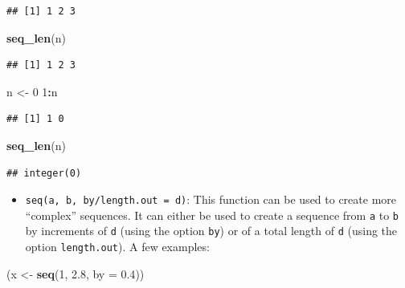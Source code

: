 \documentclass[12pt,]{krantz}
\newenvironment{Shaded}{\begin{snugshade}}{\end{snugshade}}
\newcommand{\KeywordTok}[1]{\textcolor[rgb]{0.27,0.27,0.27}{\textbf{#1}}}
\newcommand{\DataTypeTok}[1]{\textcolor[rgb]{0.27,0.27,0.27}{#1}}
\newcommand{\DecValTok}[1]{\textcolor[rgb]{0.06,0.06,0.06}{#1}}
\newcommand{\FloatTok}[1]{\textcolor[rgb]{0.06,0.06,0.06}{#1}}
\newcommand{\StringTok}[1]{\textcolor[rgb]{0.5,0.5,0.5}{#1}}
\newcommand{\OperatorTok}[1]{\textcolor[rgb]{0.43,0.43,0.43}{\textbf{#1}}}
\newcommand{\NormalTok}[1]{#1}
\providecommand{\tightlist}{%
  \setlength{\itemsep}{0pt}\setlength{\parskip}{0pt}}
\begin{document}
\begin{verbatim}
## [1] 1 2 3
\end{verbatim}

\begin{Shaded}
\begin{Highlighting}[]
\KeywordTok{seq_len}\NormalTok{(n)}
\end{Highlighting}
\end{Shaded}

\begin{verbatim}
## [1] 1 2 3
\end{verbatim}

\begin{Shaded}
\begin{Highlighting}[]
\NormalTok{n <-}\StringTok{ }\DecValTok{0}
\DecValTok{1}\OperatorTok{:}\NormalTok{n}
\end{Highlighting}
\end{Shaded}

\begin{verbatim}
## [1] 1 0
\end{verbatim}

\begin{Shaded}
\begin{Highlighting}[]
\KeywordTok{seq_len}\NormalTok{(n)}
\end{Highlighting}
\end{Shaded}

\begin{verbatim}
## integer(0)
\end{verbatim}

\begin{itemize}
\tightlist
\item
  \texttt{seq(a,\ b,\ by/length.out\ =\ d)}: This function can be used
  to create more ``complex'' sequences. It can either be used to create
  a sequence from \texttt{a} to \texttt{b} by increments of \texttt{d}
  (using the option \texttt{by}) or of a total length of \texttt{d}
  (using the option \texttt{length.out}). A few examples:
\end{itemize}

\begin{Shaded}
\begin{Highlighting}[]
\NormalTok{(x <-}\StringTok{ }\KeywordTok{seq}\NormalTok{(}\DecValTok{1}\NormalTok{, }\FloatTok{2.8}\NormalTok{, }\DataTypeTok{by =} \FloatTok{0.4}\NormalTok{))}
\end{Highlighting}
\end{Shaded}
\end{document}
